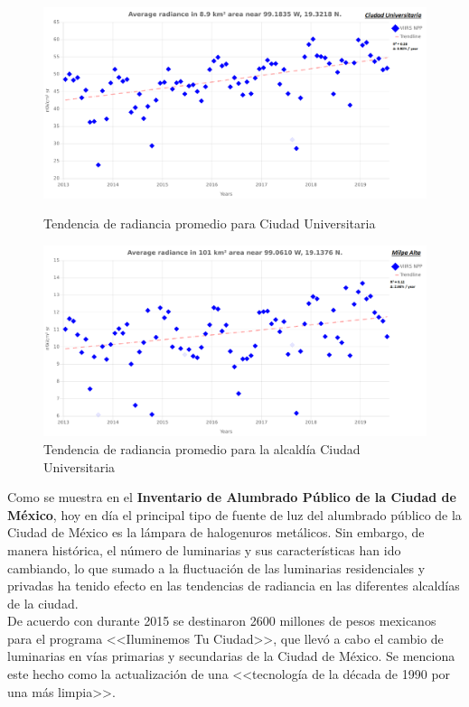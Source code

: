 \newpage


\begin{figure}[H]
  \centering
    \includegraphics[width=1\textwidth]{CU}
  \caption{Tendencia de radiancia promedio para Ciudad Universitaria}
  \label{radiancetrendscu}
\vspace{20mm} 
    \includegraphics[width=1\textwidth]{MA}
  \caption{Tendencia de radiancia promedio para la alcaldía Ciudad Universitaria}
  \label{radiancetrendsma}
\end{figure}
\blindtext


\newpage

Como se muestra en el \textbf{Inventario de Alumbrado Público de la Ciudad de México}, hoy en día el principal tipo de fuente de luz del alumbrado público de la Ciudad de México es la lámpara de halogenuros metálicos. Sin embargo, de manera histórica, el número de luminarias y sus características han ido cambiando, lo que sumado a la fluctuación de  las luminarias residenciales y privadas ha tenido efecto en las tendencias de radiancia en las diferentes alcaldías de la ciudad.\\

De acuerdo con \cite{Universal2017} durante 2015 se destinaron 2600 millones de pesos mexicanos para el programa <<Iluminemos Tu Ciudad>>, que llevó a cabo el cambio de luminarias en vías primarias y secundarias de la Ciudad de México. Se menciona este hecho como la actualización de una <<tecnología de la década de 1990 por una más limpia>>.\\

